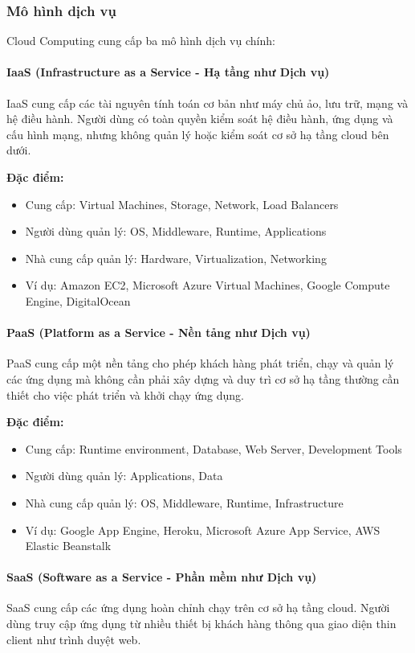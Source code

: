\subsubsection{Mô hình dịch vụ}
Cloud Computing cung cấp ba mô hình dịch vụ chính:

\paragraph{IaaS (Infrastructure as a Service - Hạ tầng như Dịch vụ)}
IaaS cung cấp các tài nguyên tính toán cơ bản như máy chủ ảo, lưu trữ, mạng và hệ điều hành. Người dùng có toàn quyền kiểm soát hệ điều hành, ứng dụng và cấu hình mạng, nhưng không quản lý hoặc kiểm soát cơ sở hạ tầng cloud bên dưới.

\textbf{Đặc điểm:}
\begin{itemize}
    \item Cung cấp: Virtual Machines, Storage, Network, Load Balancers
    \item Người dùng quản lý: OS, Middleware, Runtime, Applications
    \item Nhà cung cấp quản lý: Hardware, Virtualization, Networking
    \item Ví dụ: Amazon EC2, Microsoft Azure Virtual Machines, Google Compute Engine, DigitalOcean
\end{itemize}

\paragraph{PaaS (Platform as a Service - Nền tảng như Dịch vụ)}
PaaS cung cấp một nền tảng cho phép khách hàng phát triển, chạy và quản lý các ứng dụng mà không cần phải xây dựng và duy trì cơ sở hạ tầng thường cần thiết cho việc phát triển và khởi chạy ứng dụng.

\textbf{Đặc điểm:}
\begin{itemize}
    \item Cung cấp: Runtime environment, Database, Web Server, Development Tools
    \item Người dùng quản lý: Applications, Data
    \item Nhà cung cấp quản lý: OS, Middleware, Runtime, Infrastructure
    \item Ví dụ: Google App Engine, Heroku, Microsoft Azure App Service, AWS Elastic Beanstalk
\end{itemize}

\paragraph{SaaS (Software as a Service - Phần mềm như Dịch vụ)}
SaaS cung cấp các ứng dụng hoàn chỉnh chạy trên cơ sở hạ tầng cloud. Người dùng truy cập ứng dụng từ nhiều thiết bị khách hàng thông qua giao diện thin client như trình duyệt web.

